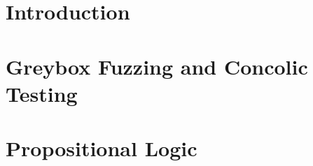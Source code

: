 \documentclass[12pt,openany]{book}
\begin{document}
	
	
	\tableofcontents
	\newpage
	\chapter{Introduction}
	
	
	\newpage
	\chapter{Greybox Fuzzing and Concolic Testing}
	
	
	\newpage
	\chapter{Propositional Logic}
	
	
	
	
%	
	
%	
	
	
\end{document}
